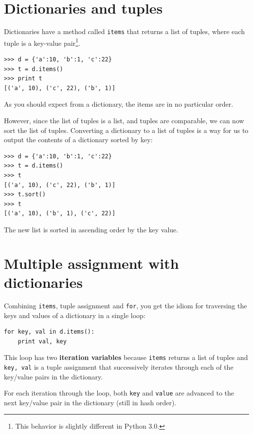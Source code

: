 \documentclass[10pt]{book}
\begin{document}
\section{Dictionaries and tuples}


Dictionaries have a method called {\tt items} that returns a list of
tuples, where each tuple is a key-value 
pair\footnote{This behavior is slightly different in Python 3.0.}.

\beforeverb
\begin{verbatim}
>>> d = {'a':10, 'b':1, 'c':22}
>>> t = d.items()
>>> print t
[('a', 10), ('c', 22), ('b', 1)]
\end{verbatim}
\afterverb
%
As you should expect from a dictionary, the items are in no
particular order.

However, since the list of tuples is a list, and tuples are comparable,
we can now sort the list of tuples.  Converting a dictionary
to a list of tuples is a way for us to output the contents of a 
dictionary sorted by key:

\beforeverb
\begin{verbatim}
>>> d = {'a':10, 'b':1, 'c':22}
>>> t = d.items()
>>> t
[('a', 10), ('c', 22), ('b', 1)]
>>> t.sort()
>>> t
[('a', 10), ('b', 1), ('c', 22)]
\end{verbatim}
\afterverb
%
The new list is sorted in ascending order by the key value.

\section{Multiple assignment with dictionaries}


Combining {\tt items}, tuple assignment and {\tt for}, you
get the idiom for traversing the keys and values of a dictionary
in a single loop:

\beforeverb
\begin{verbatim}
for key, val in d.items():
    print val, key
\end{verbatim}
\afterverb
%
This loop has two {\bf iteration variables} because {\tt items} returns
a list of tuples and {\tt key, val} is a tuple assignment
that successively iterates through each of the key/value pairs in the dictionary.  

For each iteration
through the loop, both {\tt key} and {\tt value} are advanced to the
next key/value pair in the dictionary (still in hash order).
\end{document}
